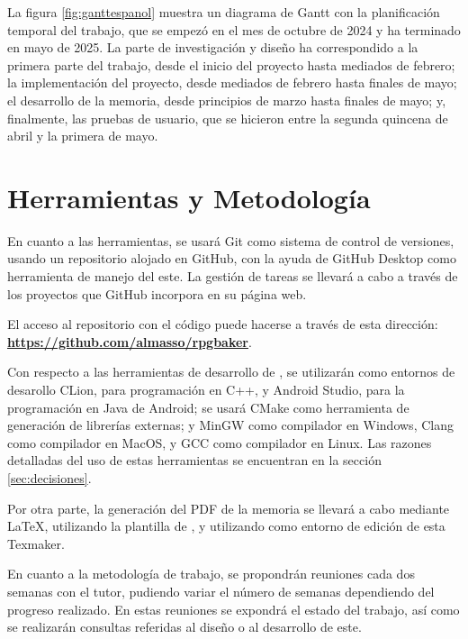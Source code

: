La figura \ref{fig:ganttespanol} muestra un diagrama de Gantt con la planificación temporal del trabajo, que se empezó en el mes de octubre de 2024 y ha terminado en mayo de 2025. La parte de investigación y diseño ha correspondido a la primera parte del trabajo, desde el inicio del proyecto hasta mediados de febrero; la implementación del proyecto, desde mediados de febrero hasta finales de mayo; el desarrollo de la memoria, desde principios de marzo hasta finales de mayo; y, finalmente, las pruebas de usuario, que se hicieron entre la segunda quincena de abril y la primera de mayo.


\section{Herramientas y Metodología}
En cuanto a las herramientas, se usará Git como sistema de control de versiones, usando un repositorio alojado en GitHub, con la ayuda de GitHub Desktop como herramienta de manejo del este. La gestión de tareas se llevará a cabo a través de los proyectos que GitHub incorpora en su página web.

\smallskip

El acceso al repositorio con el código puede hacerse a través de esta dirección: \href{https://github.com/almasso/rpgbaker}{\textbf{https://github.com/almasso/rpgbaker}}.

\medskip

Con respecto a las herramientas de desarrollo de \baker, se utilizarán como entornos de desarollo CLion, para programación en C++, y Android Studio, para la programación en Java de Android; se usará CMake como herramienta de generación de librerías externas; y MinGW como compilador en Windows, Clang como compilador en MacOS, y GCC como compilador en Linux. Las razones detalladas del uso de estas herramientas se encuentran en la sección \ref{sec:decisiones}.

\medskip

Por otra parte, la generación del PDF de la memoria se llevará a cabo mediante \LaTeX , utilizando la plantilla de \texis , y utilizando como entorno de edición de esta Texmaker.

\bigskip

En cuanto a la metodología de trabajo, se propondrán reuniones cada dos semanas con el tutor, pudiendo variar el número de semanas dependiendo del progreso realizado. En estas reuniones se expondrá el estado del trabajo, así como se realizarán consultas referidas al diseño o al desarrollo de este.

